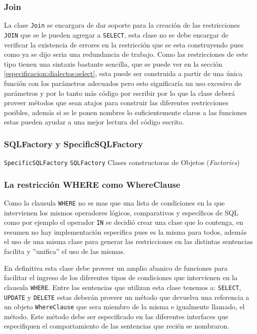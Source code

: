 \subsubsection{Join}
La clase \verb=Join= se encargara de dar soporte para la creación de las restricciones \verb=JOIN= que se le pueden agregar a \verb=SELECT=, esta clase no se debe encargar de verificar la existencia de errores en la restricción que se esta construyendo pues como ya se dijo seria una redundancia de trabajo. Como las restricciones de este tipo tienen una sintaxis bastante sencilla, que se puede ver en la sección \ref{especificacion:dialectos:select}, esta puede ser construida a partir de una única función con los parámetros adecuados pero esto significaría un uso excesivo de parámetros y por lo tanto más código por escribir por lo que la clase deberá proveer métodos que sean atajos para construir las diferentes restricciones posibles, además si se le ponen nombres lo suficientemente claros a las funciones estas pueden ayudar a una mejor lectura del código escrito.

\subsubsection{SQLFactory y SpecificSQLFactory}
\verb=SpecificSQLFactory=
\verb=SQLFactory=
Clases constructoras de Objetos (\textit{Factories})

\subsubsection{La restricción WHERE como WhereClause}
Como la clausula \verb=WHERE= no es mas que una lista de condiciones en la que intervienen los mismos operadores lógicos, comparativos y específicos de SQL como por ejemplo el operador \verb=IN= se decidió crear una clase que lo contenga, en resumen no hay implementación especifica pues es la misma para todos, además el uso de una misma clase para generar las restricciones en las distintas sentencias facilita y ''unifica'' el uso de las mismas.

En definitiva esta clase debe proveer un amplio abanico de funciones para facilitar el ingreso de los diferentes tipos de condiciones que intervienen en la clausula \verb=WHERE=. Entre las sentencias que utilizan esta clase tenemos a: \verb=SELECT=, \verb=UPDATE= y \verb=DELETE= estas deberán proveer un método que devuelva una referencia a un objeto \verb=WhereClause= que sera miembro de la misma e igualmente llamado, el método. Este método debe ser especificado en las diferentes interfaces que especifiquen el comportamiento de las sentencias que recién se nombraron. 

